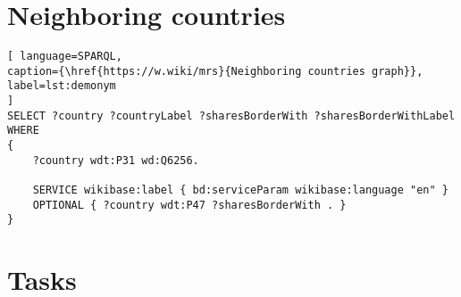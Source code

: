 \section{Neighboring countries}

\begin{lstlisting}[ language=SPARQL, 
caption={\href{https://w.wiki/mrs}{Neighboring countries graph}},
label=lst:demonym
]
SELECT ?country ?countryLabel ?sharesBorderWith ?sharesBorderWithLabel
WHERE
{
	?country wdt:P31 wd:Q6256.
	
	SERVICE wikibase:label { bd:serviceParam wikibase:language "en" }
	OPTIONAL { ?country wdt:P47 ?sharesBorderWith . }
}
\end{lstlisting}

\section{Tasks}